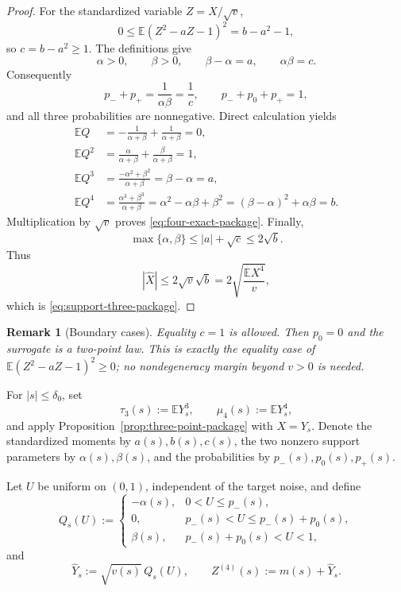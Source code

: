 \documentclass[10pt,a4paper]{amsart}
\newtheorem{remark}[theorem]{Remark}
\newcommand{\E}{\mathbb E}
\begin{document}
\begin{proof}
For the standardized variable \(Z=X/\sqrt v\),
\[
 0\le\E(Z^2-aZ-1)^2=b-a^2-1,
\]
so \(c=b-a^2\ge1\).  The definitions give
\begin{equation}\label{eq:alpha-identities-package}
 \alpha>0,
 \qquad
 \beta>0,
 \qquad
 \beta-\alpha=a,
 \qquad
 \alpha\beta=c.
\end{equation}
Consequently
\[
 p_-+p_+
 =\frac{1}{\alpha\beta}=\frac1c,
 \qquad
 p_-+p_0+p_+=1,
\]
and all three probabilities are nonnegative.  Direct calculation yields
\begin{align*}
 \E Q
 &=-\frac{1}{\alpha+\beta}
   +\frac{1}{\alpha+\beta}=0,\\
 \E Q^2
 &=\frac{\alpha}{\alpha+\beta}
   +\frac{\beta}{\alpha+\beta}=1,\\
 \E Q^3
 &=\frac{-\alpha^2+\beta^2}{\alpha+\beta}
   =\beta-\alpha=a,\\
 \E Q^4
 &=\frac{\alpha^3+\beta^3}{\alpha+\beta}
   =\alpha^2-\alpha\beta+\beta^2
   =(\beta-\alpha)^2+\alpha\beta=b.
\end{align*}
Multiplication by \(\sqrt v\) proves \eqref{eq:four-exact-package}.  Finally,
\[
 \max\{\alpha,\beta\}
 \le |a|+\sqrt c
 \le2\sqrt b.
\]
Thus
\[
 |\widehat X|
 \le2\sqrt v\sqrt b
 =2\sqrt{\frac{\E X^4}{v}},
\]
which is \eqref{eq:support-three-package}.
\end{proof}

\begin{remark}[Boundary cases]
Equality \(c=1\) is allowed.  Then \(p_0=0\) and the surrogate is a two-point
law.  This is exactly the equality case of
\(\E(Z^2-aZ-1)^2\ge0\); no nondegeneracy margin beyond \(v>0\) is needed.
\end{remark}

For \(|s|\le\delta_0\), set
\begin{equation}\label{eq:shifted-moments-package}
 \tau_3(s):=\E Y_s^3,
 \qquad
 \mu_4(s):=\E Y_s^4,
\end{equation}
and apply Proposition~\ref{prop:three-point-package} with \(X=Y_s\).  Denote
the standardized moments by \(a(s),b(s),c(s)\), the two nonzero support
parameters by \(\alpha(s),\beta(s)\), and the probabilities by
\(p_-(s),p_0(s),p_+(s)\).

Let \(U\) be uniform on \((0,1)\), independent of the target noise, and define
\begin{equation}\label{eq:Q-s-U-package}
 Q_s(U):=
 \begin{cases}
 -\alpha(s),&0<U\le p_-(s),\\
 0,&p_-(s)<U\le p_-(s)+p_0(s),\\
 \beta(s),&p_-(s)+p_0(s)<U<1,
 \end{cases}
\end{equation}
and
\begin{equation}\label{eq:Yhat-s-package}
 \widehat Y_s:=\sqrt{v(s)}\,Q_s(U),
 \qquad
 Z^{(4)}(s):=m(s)+\widehat Y_s.
\end{equation}
\end{document}
